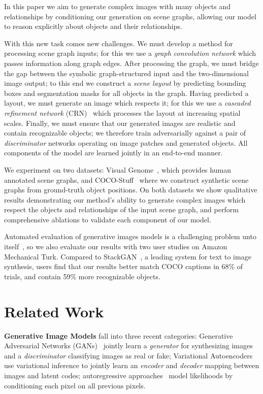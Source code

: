 \documentclass[10pt,twocolumn,letterpaper]{article}
\begin{document}
In this paper we aim to generate complex images with many objects and
relationships by conditioning our generation on scene graphs, allowing our
model to reason explicitly about objects and their relationships.

With this new task comes new challenges. We must develop a method for processing
scene graph inputs; for this we use a \emph{graph convolution network} which passes information along graph edges. After processing the graph, we must bridge the gap between the symbolic graph-structured input and the two-dimensional image output; to this end we construct a \emph{scene layout} by predicting bounding boxes and segmentation masks for all objects in the graph. Having predicted a layout, we must generate an image which respects it; for this we use a \emph{cascaded refinement network} (CRN)~\cite{chen2017photographic} which processes the layout at increasing spatial scales. Finally, we must ensure that our generated images are realistic and contain recognizable objects; we therefore train adversarially against a pair of \emph{discriminator} networks operating on image patches and generated objects. All components of the model are learned jointly in an end-to-end manner.

We experiment on two datasets: Visual Genome~\cite{krishna2017visual},
which provides human annotated scene graphs, and 
COCO-Stuff~\cite{caesar2016coco} where we construct synthetic scene graphs from
ground-truth object positions. On both datasets we show qualitative results
demonstrating our method's ability to generate complex images which respect the
objects and relationships of the input scene graph, and perform comprehensive
ablations to validate each component of our model.

Automated evaluation of generative images models is a challenging
problem unto itself~\cite{theis2016note}, so we also evaluate our results with
two user studies on Amazon Mechanical Turk. Compared to StackGAN~\cite{zhang2017stackgan}, a leading system for text to image synthesis, users find that our results better match COCO captions in 68\% of trials, and contain 59\% more recognizable objects.
 

\section{Related Work}
\textbf{Generative Image Models} fall into three recent categories:
Generative Adversarial Networks (GANs)~\cite{goodfellow2014generative,radford2016unsupervised} jointly learn a \emph{generator} for synthesizing images and a \emph{discriminator} classifying images as real or fake;
Variational Autoencoders~\cite{kingma2014auto} 
use variational inference to jointly learn an \emph{encoder} and \emph{decoder} mapping between images and latent codes;
autoregressive approaches~\cite{oord2016pixel,oord2016conditional} model likelihoods by conditioning each pixel on all previous pixels.
\end{document}
